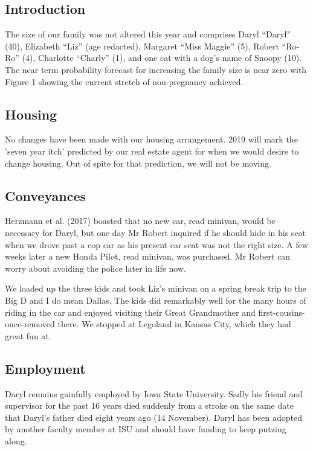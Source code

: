 \documentclass[letterpaper,11pt]{article}
\begin{document}
\begin{multicols}{2}

\section{Introduction} 

The size of our family was not altered this year and comprises Daryl
\enquote{Daryl} (40), Elizabeth \enquote{Liz} (age redacted),
Margaret \enquote{Miss Maggie} (5), Robert \enquote{Ro-Ro} (4), Charlotte
 \enquote{Charly} (1), and one cat with a dog's name of Snoopy (10).  The near
 term probability forecast for increasing the family size is near zero with
 Figure 1 showing the current stretch of non-pregnancy achieved.  

\subsection{Housing}

No changes have been made with our housing arrangement. 2019 will mark the
'seven year itch' predicted by our real estate agent for when we would desire
to change housing. Out of spite for that prediction, we will not be moving.

\subsection{Conveyances}

Herzmann et al. (2017) boasted that no new car, read minivan, would be necessary
for Daryl, but one day Mr Robert inquired if he should hide in his seat when
we drove past a cop car as his present car seat was not the right size. A few
weeks later a new Honda Pilot, read minivan, was purchased.  Mr Robert can
worry about avoiding the police later in life now.

We loaded up the three kids and took Liz's minivan on a spring break trip to
the Big D and I do mean Dallas. The kids did remarkably well for the many
hours of riding in the car and enjoyed visiting their Great Grandmother and
first-cousins-once-removed there.  We stopped at Legoland in Kansas City,
which they had great fun at.

\subsection{Employment}
Daryl remains gainfully employed by Iowa State University. Sadly his friend and supervisor
for the past 16 years died suddenly from a stroke on the same date that Daryl's
father died eight years ago (14 November). Daryl has been adopted by another
faculty member at ISU and should have funding to keep putzing along.


\end{multicols}
\end{document}
